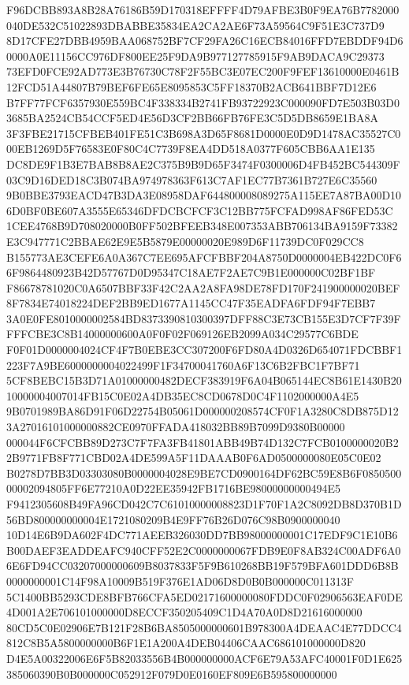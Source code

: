 \documentclass[UTF8,fontset=fandol,zihao=-4,a4paper]{ctexart}
\begin{document}
{{F96DCBB893A8B28A76186B59D170318EFFFF4D79AFBE3B0F9EA76B7782000040DE532C51022893DBABBE35834EA2CA2AE6F73A59564C9F51E3C737D9
8D17CFE27DBB4959BAA068752BF7CF29FA26C16ECB84016FFD7EBDDF94D60000A0E11156CC976DF800EE25F9DA9B977127785915F9AB9DACA9C29373
73EFD0FCE92AD773E3B76730C78F2F55BC3E07EC200F9FEF13610000E0461B12FCD51A44807B79BEF6FE65E8095853C5FF18370B2ACB641BBF7D12E6
B7FF77FCF6357930E559BC4F338334B2741FB93722923C000090FD7E503B03D03685BA2524CB54CCF5ED4E56D3CF2BB66FB76FE3C5D5DB8659E1BA8A
3F3FBE21715CFBEB401FE51C3B698A3D65F8681D0000E0D9D1478AC35527C000EB1269D5F76583E0F80C4C7739F8EA4DD518A0377F605CBB6AA1E135
DC8DE9F1B3E7BAB8B8AE2C375B9B9D65F3474F0300006D4FB452BC544309F03C9D16DED18C3B074BA974978363F613C7AF1EC77B7361B727E6C35560
9B0BBE3793EACD47B3DA3E08958DAF644800008089275A115EE7A87BA00D106D0BF0BE607A3555E65346DFDCBCFCF3C12BB775FCFAD998AF86FED53C
1CEE4768B9D708020000B0FF502BFEEB348E007353ABB706134BA9159F73382E3C947771C2BBAE62E9E5B5879E00000020E989D6F11739DC0F029CC8
B155773AE3CEFE6A0A367C7EE695AFCFBBF204A8750D0000004EB422DC0F66F9864480923B42D57767D0D95347C18AE7F2AE7C9B1E000000C02BF1BF
F86678781020C0A6507BBF33F42C2AA2A8FA98DE78FD170F241900000020BEF8F7834E74018224DEF2BB9ED1677A1145CC47F35EADFA6FDF94F7EBB7
3A0E0FE8010000002584BD8373390810300397DFF88C3E73CB155E3D7CF7F39FFFFCBE3C8B14000000600A0F0F02F069126EB2099A034C29577C6BDE
F0F01D0000004024CF4F7B0EBE3CC307200F6FD80A4D0326D654071FDCBBF1223F7A9BE6000000004022499F1F34700041760A6F13C6B2FBC1F7BF71
5CF8BEBC15B3D71A01000000482DECF383919F6A04B065144EC8B61E1430B2010000004007014FB15C0E02A4DB35EC8CD0678D0C4F1102000000A4E5
9B0701989BA86D91F06D22754B05061D000000208574CF0F1A3280C8DB875D123A27016101000000882CE0970FFADA418032BB89B7099D9380B00000
000044F6CFCBB89D273C7F7FA3FB41801ABB49B74D132C7FCB0100000020B22B9771FB8F771CBD02A4DE599A5F11DAAAB0F6AD0500000080E05C0E02
B0278D7BB3D03303080B0000004028E9BE7CD0900164DF62BC59E8B6F085050000002094805FF6E77210A0D22EE35942FB1716BE98000000000494E5
F9412305608B49FA96CD042C7C61010000008823D1F70F1A2C8092DB8D370B1D56BD800000000004E1721080209B4E9FF76B26D076C98B0900000040
10D14E6B9DA602F4DC771AEEB326030DD7BB98000000001C17EDF9C1E10B6B00DAEF3EADDEAFC940CFF52E2C0000000067FDB9E0F8AB324C00ADF6A0
6E6FD94CC03207000000609B8037833F5F9B610268BB19F579BFA601DDD6B8B0000000001C14F98A10009B519F376E1AD06D8D0B0B000000C011313F
5C1400BB5293CDE8BFB766CFA5ED02171600000080FDDC0F02906563EAF0DE4D001A2E706101000000D8ECCF350205409C1D4A70A0D8D21616000000
80CD5C0E02906E7B121F28B6BA8505000000601B978300A4DEAAC4E77DDCC4812C8B5A5800000000B6F1E1A200A4DEB04406CAAC686101000000D820
D4E5A00322006E6F5B82033556B4B000000000ACF6E79A53AFC40001F0D1E625385060390B0B000000C052912F079D0E0160EF809E6B595800000000
}}
\end{document}
